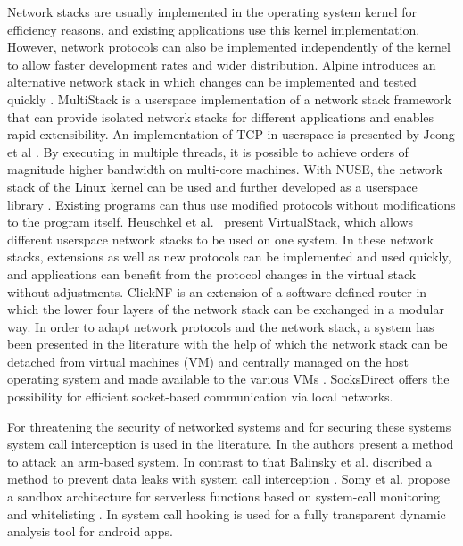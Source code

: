 Network stacks are usually implemented in the operating system kernel for efficiency reasons, and existing applications use this kernel implementation. 
However, network protocols can also be implemented independently of the kernel to allow faster development rates and wider distribution. 
Alpine introduces an alternative network stack in which changes can be implemented and tested quickly \cite{A3:ely2001alpine}.
MultiStack \cite{A3:honda2014rekindling} is a userspace implementation of a network stack framework that can provide isolated network stacks for different applications and enables rapid extensibility. 
An implementation of TCP in userspace is presented by Jeong et al \cite{A3:jeong2014mtcp}.
By executing in multiple threads, it is possible to achieve orders of magnitude higher bandwidth on multi-core machines.
With NUSE, the network stack of the Linux kernel can be used and further developed as a userspace library \cite{A3:tazaki2015library}. 
Existing programs can thus use modified protocols without modifications to the program itself.
Heuschkel et al.~\cite{A3:heuschkel2016virtualstack} present VirtualStack, which allows different userspace network stacks to be used on one system. 
In these network stacks, extensions as well as new protocols can be implemented and used quickly, and applications can benefit from the protocol changes in the virtual stack without adjustments. 
ClickNF \cite{A3:gallo2018clicknf} is an extension of a software-defined router in which the lower four layers of the network stack can be exchanged in a modular way. 
In order to adapt network protocols and the network stack, a system has been presented in the literature with the help of which the network stack can be detached from virtual machines (VM) and centrally managed on the host operating system and made available to the various VMs \cite{A3:niu2019netkernel}. 
SocksDirect \cite{A3:li2019socksdirect} offers the possibility for efficient socket-based communication via local networks. 



For threatening the security of networked systems and for securing these systems system call interception is used in the literature. 
In \cite{lee2011experimenting} the authors present a method to attack an arm-based system. 
In contrast to that Balinsky et al. discribed a method to prevent data leaks with system call interception \cite{Balinsky2011}.
Somy et al. propose a sandbox architecture for serverless functions based on system-call monitoring and whitelisting \cite{somy2020system}. 
In \cite{druffel2020davinci} system call hooking is used for a fully transparent dynamic analysis tool for android apps. 